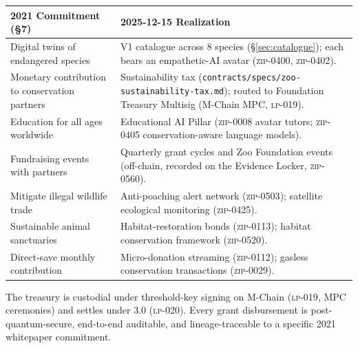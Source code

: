 \begin{table}[h]
\centering
\small
\begin{tabular}{p{6.5cm}p{8cm}}
\toprule
\textbf{2021 Commitment (\S7)} & \textbf{2025-12-15 Realization} \\
\midrule
Digital twins of endangered species &
V1 \NFT{} catalogue across 8 species (\S\ref{sec:catalogue}); each \NFT{} bears an empathetic-AI avatar (\textsc{zip-0400}, \textsc{zip-0402}). \\
Monetary contribution to conservation partners &
Sustainability tax (\texttt{contracts/specs/zoo-sustainability-tax.md}); routed to Foundation Treasury Multisig (M-Chain MPC, \textsc{lp-019}). \\
Education for all ages worldwide &
Educational AI Pillar (\textsc{zip-0008} avatar tutors; \textsc{zip-0405} conservation-aware language models). \\
Fundraising events with partners &
Quarterly grant cycles and Zoo Foundation events (off-chain, recorded on the Evidence Locker, \textsc{zip-0560}). \\
Mitigate illegal wildlife trade &
Anti-poaching alert network (\textsc{zip-0503}); satellite ecological monitoring (\textsc{zip-0425}). \\
Sustainable animal sanctuaries &
Habitat-restoration bonds (\textsc{zip-0113}); habitat conservation framework (\textsc{zip-0520}). \\
Direct-save monthly contribution &
Micro-donation streaming (\textsc{zip-0112}); gasless conservation transactions (\textsc{zip-0029}). \\
\bottomrule
\end{tabular}
\end{table}

The treasury is custodial under threshold-key signing on M-Chain
(\textsc{lp-019}, MPC ceremonies) and settles under \Quasar{} 3.0
(\textsc{lp-020}). Every grant disbursement is post-quantum-secure,
end-to-end auditable, and lineage-traceable to a specific 2021
whitepaper commitment.
